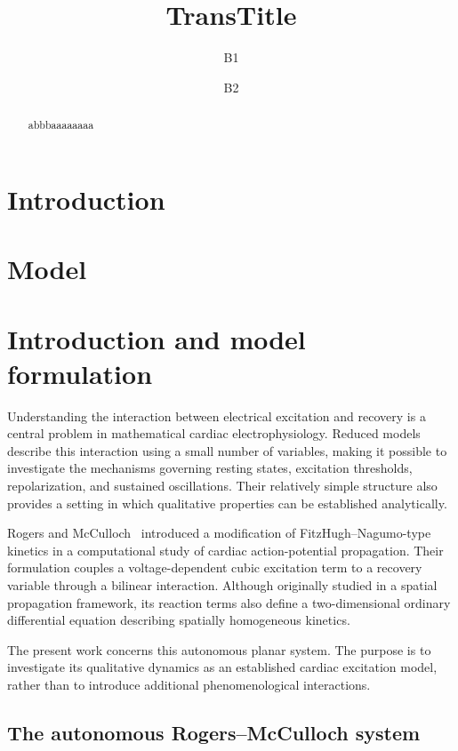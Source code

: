 \documentclass[11pt,reqno]{amsart}
\title[T]{TransTitle}
\author[A1]{B1}
\author[A2]{B2}
\theoremstyle{plain}
\theoremstyle{definition}
\theoremstyle{remark}
\begin{document}
\maketitle


\begin{abstract}
abbbaaaaaaaa
\end{abstract}

\section{Introduction}
\label{sec:intro}


\section{Model}
\label{sec:model}


\section{Introduction and model formulation}
\label{sec:introduction}

Understanding the interaction between electrical excitation and
recovery is a central problem in mathematical cardiac
electrophysiology. Reduced models describe this interaction using
a small number of variables, making it possible to investigate
the mechanisms governing resting states, excitation thresholds,
repolarization, and sustained oscillations. Their relatively
simple structure also provides a setting in which qualitative
properties can be established analytically.

Rogers and McCulloch~\cite{RogersMcCulloch1994} introduced a
modification of FitzHugh--Nagumo-type kinetics in a computational
study of cardiac action-potential propagation. Their formulation
couples a voltage-dependent cubic excitation term to a recovery
variable through a bilinear interaction. Although originally
studied in a spatial propagation framework, its reaction terms
also define a two-dimensional ordinary differential equation
describing spatially homogeneous kinetics.

The present work concerns this autonomous planar system.
The purpose is to investigate its qualitative dynamics as an
established cardiac excitation model, rather than to introduce
additional phenomenological interactions.

\subsection{The autonomous Rogers--McCulloch system}
\label{subsec:model}
\end{document}
